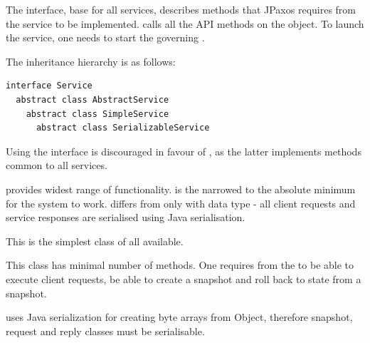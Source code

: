 The  interface, base for all services, describes methods that JPaxos requires from the service to be implemented.  calls all the API methods on the  object. To launch the service, one needs to start the governing .

\clearpage

The inheritance hierarchy is as follows:

\begin{Verbatim}[commandchars=@\[\]]
interface Service
  abstract class AbstractService
    abstract class SimpleService
      abstract class SerializableService
\end{Verbatim}

Using the  interface is discouraged in favour of , as the latter implements methods common to all services.

 provides widest range of functionality.  is the  narrowed to the absolute minimum for the system to work.  differs from  only with data type - all client requests and service responses are serialised using Java serialisation.


\label{api:serializableservice-class}
This is the simplest class of all available.

This class has minimal number of methods. One requires from the  to be able to execute client requests, be able to create a snapshot and roll back to state from a snapshot.

 uses Java serialization for creating byte arrays from Object, therefore snapshot, request and reply classes must be serialisable.

